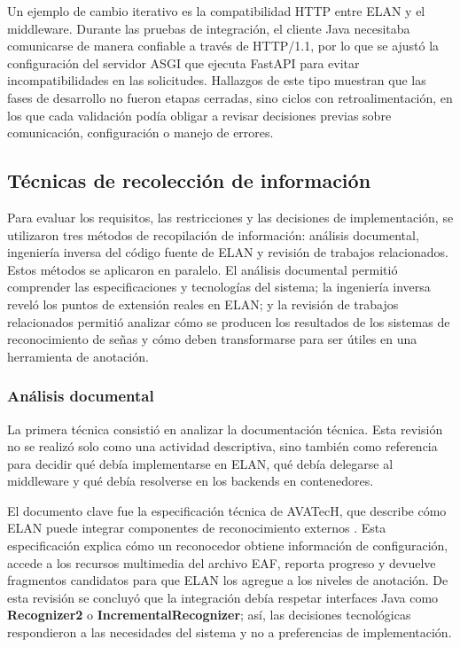 \documentclass[11pt,a4paper]{article}
\begin{document}
Un ejemplo de cambio iterativo es la compatibilidad HTTP entre ELAN y el middleware. Durante las pruebas de integración, el cliente Java necesitaba comunicarse de manera confiable a través de HTTP/1.1, por lo que se ajustó la configuración del servidor ASGI que ejecuta FastAPI para evitar incompatibilidades en las solicitudes. Hallazgos de este tipo muestran que las fases de desarrollo no fueron etapas cerradas, sino ciclos con retroalimentación, en los que cada validación podía obligar a revisar decisiones previas sobre comunicación, configuración o manejo de errores.

\subsection{Técnicas de recolección de información}

Para evaluar los requisitos, las restricciones y las decisiones de implementación, se utilizaron tres métodos de recopilación de información: análisis documental, ingeniería inversa del código fuente de ELAN y revisión de trabajos relacionados. Estos métodos se aplicaron en paralelo. El análisis documental permitió comprender las especificaciones y tecnologías del sistema; la ingeniería inversa reveló los puntos de extensión reales en ELAN; y la revisión de trabajos relacionados permitió analizar cómo se producen los resultados de los sistemas de reconocimiento de señas y cómo deben transformarse para ser útiles en una herramienta de anotación.

\subsubsection{Análisis documental}

La primera técnica consistió en analizar la documentación técnica. Esta revisión no se realizó solo como una actividad descriptiva, sino también como referencia para decidir qué debía implementarse en ELAN, qué debía delegarse al middleware y qué debía resolverse en los backends en contenedores.

El documento clave fue la especificación técnica de AVATecH, que describe cómo ELAN puede integrar componentes de reconocimiento externos \cite{auer2014avatech}. Esta especificación explica cómo un reconocedor obtiene información de configuración, accede a los recursos multimedia del archivo EAF, reporta progreso y devuelve fragmentos candidatos para que ELAN los agregue a los niveles de anotación. De esta revisión se concluyó que la integración debía respetar interfaces Java como \textbf{Recognizer2} o \textbf{IncrementalRecognizer}; así, las decisiones tecnológicas respondieron a las necesidades del sistema y no a preferencias de implementación.
\end{document}
